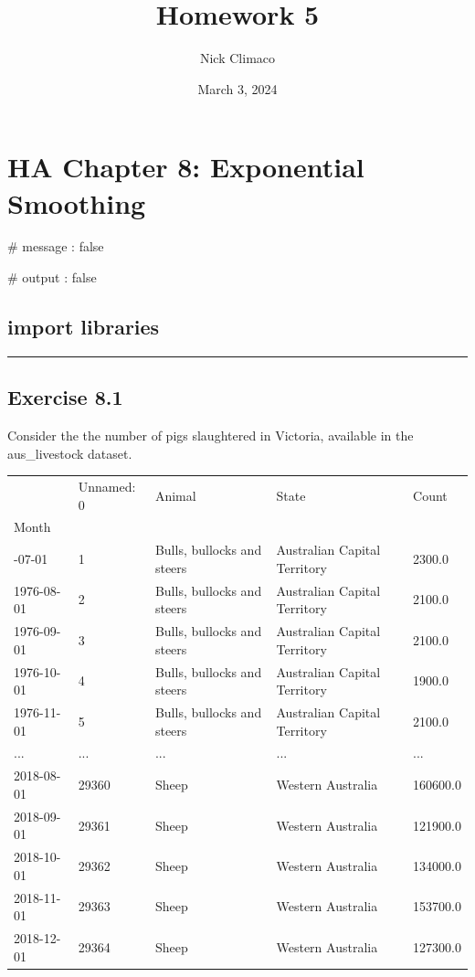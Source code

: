\documentclass[
  11pt,
]{article}
\title{Homework 5}
\author{Nick Climaco}
\date{March 3, 2024}
\renewcommand*\contentsname{Table of contents}
\newcommand\contentsname{Table of contents}
\begin{document}
\maketitle

\renewcommand*\contentsname{Table of contents}
{
\hypersetup{linkcolor=}
\setcounter{tocdepth}{3}
\tableofcontents
}
\section{HA Chapter 8: Exponential
Smoothing}\label{ha-chapter-8-exponential-smoothing}

\#\textbar{} message : false

\#\textbar{} output : false

\subsection{import libraries}\label{import-libraries}

\begin{center}\rule{0.5\linewidth}{0.5pt}\end{center}

\subsection{Exercise 8.1}\label{exercise-8.1}

Consider the the number of pigs slaughtered in Victoria, available in
the aus\_livestock dataset.

\begin{longtable}[]{@{}lllll@{}}
\toprule\noalign{}
& Unnamed: 0 & Animal & State & Count \\
Month & & & & \\
\midrule\noalign{}
\endhead
\bottomrule\noalign{}
\endlastfoot
1976-07-01 & 1 & Bulls, bullocks and steers & Australian Capital
Territory & 2300.0 \\
1976-08-01 & 2 & Bulls, bullocks and steers & Australian Capital
Territory & 2100.0 \\
1976-09-01 & 3 & Bulls, bullocks and steers & Australian Capital
Territory & 2100.0 \\
1976-10-01 & 4 & Bulls, bullocks and steers & Australian Capital
Territory & 1900.0 \\
1976-11-01 & 5 & Bulls, bullocks and steers & Australian Capital
Territory & 2100.0 \\
... & ... & ... & ... & ... \\
2018-08-01 & 29360 & Sheep & Western Australia & 160600.0 \\
2018-09-01 & 29361 & Sheep & Western Australia & 121900.0 \\
2018-10-01 & 29362 & Sheep & Western Australia & 134000.0 \\
2018-11-01 & 29363 & Sheep & Western Australia & 153700.0 \\
2018-12-01 & 29364 & Sheep & Western Australia & 127300.0 \\
\end{longtable}
\end{document}
